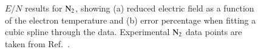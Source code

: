 \begin{figure}[h]
\caption{$E/N$ results for $\rm N_2$, showing (a) reduced electric field as a function of the electron temperature and (b) error percentage when fitting a cubic spline through the data. Experimental $\rm N_2$ data points are taken from Ref.\ .}
\label{fig:electronimpact_1}
\end{figure}
%
